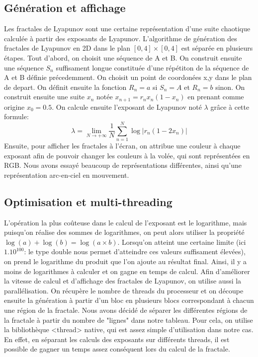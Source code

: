 \documentclass{article}
\begin{document}
	\subsection{Génération et affichage}
	Les fractales de Lyapunov sont une certaine représentation d'une suite chaotique calculée à partir des exposants de Lyapunov.
	L'algorithme de génération des fractales de Lyapunov en 2D dans le plan $[0,4] \times [0,4]$ est séparée en plusieurs étapes.
	Tout d'abord, on choisit une séquence de A et B.
	On construit ensuite une séquence $S_n$ suffisament longue constituée d'une répétiton de la séquence de A et B définie précedemment.
	On choisit un point de coordonées x,y dans le plan de depart.
	On définit ensuite la fonction $R_n = a$ si $ S_n = A $ et $R_n = b$ sinon.
	On construit ensuite une suite $x_n$ notée $x_{{n+1}}=r_{n}x_{n}(1-x_{n})$ en prenant comme origine $x_0 = 0.5$.
	On calcule ensuite l'exposant de Lyapunov noté $\lambda$ grâce à cette formule:
	\[
		\lambda = \lim_{N \to +\infty} \frac{1}{N} \sum_{n=1}^{N} \log | r_n(1-2x_n) |
	\]
	Ensuite, pour afficher les fractales à l'écran, on attribue une couleur à chaque exposant afin de pouvoir changer les couleurs à la volée, qui sont représentées en RGB.
	Nous avons essayé beaucoup de représentations différentes, ainsi qu'une représentation arc-en-ciel en mouvement.

	\subsection{Optimisation et multi-threading}

	L'opération la plus coûteuse dans le calcul de l'exposant est le logarithme, mais puisqu'on réalise des sommes de logarithmes, on peut alors utiliser la propriété $\log(a) + \log(b) = \log(a \times b)$.
	Lorsqu'on atteint une certaine limite (ici $1.10^{100}$: le type double nous permet d'atteindre ces valeurs suffisament élevées), on prend le logarithme du produit que l'on ajoute au résultat final.
	Ainsi, il y a moins de logarithmes à calculer et on gagne en temps de calcul.
	Afin d'améliorer la vitesse de calcul et d'affichage des fractales de Lyapunov, on utilise aussi la parallélisation.
	On récupère le nombre de threads du processeur et on découpe ensuite la génération à partir d'un bloc en plusieurs blocs correspondant à chacun une région de la fractale.
	Nous avons décidé de séparer les différentes régions de la fractale à partir du nombre de "lignes" dans notre tableau.
	Pour cela, on utilise la bibliothèque <thread> native, qui est assez simple d'utilisation dans notre cas.
	En effet, en séparant les calculs des exposants sur différents threads, il est possible de gagner un temps assez conséquent lors du calcul de la fractale.
\end{document}
